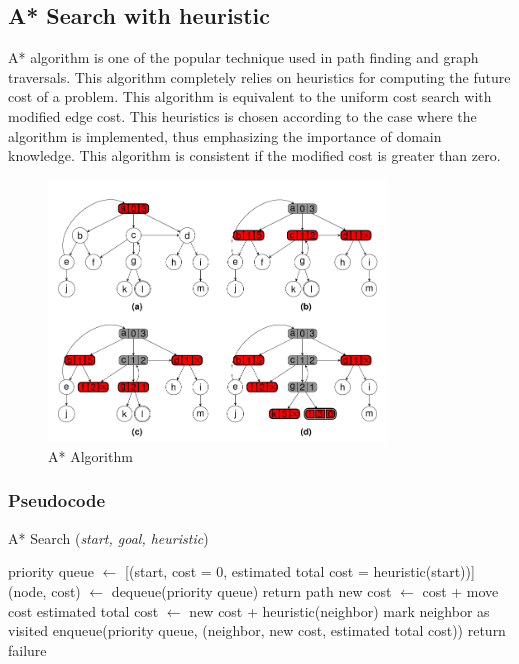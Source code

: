 \subsection{A* Search with heuristic}
\noindent A* algorithm is one of the popular technique used in path finding and graph traversals. This algorithm completely relies on heuristics for computing the future cost of a problem. This algorithm is equivalent to the uniform cost search with modified edge cost. This heuristics is chosen according to the case where the algorithm is implemented, thus emphasizing the importance of domain knowledge. This algorithm is consistent if the modified cost is greater than zero.

\begin{figure}[H]
	\centering
	\includegraphics[width=0.8\textwidth]{./imgs/astar.png}
	\caption{A* Algorithm}
\end{figure}

\subsubsection{Pseudocode}
\begin{algorithm}[H]
	\caption{A* Search (\textit{start, goal, heuristic})}
	\label{alg:astar}
	\begin{algorithmic}[1]
		\State priority queue \(\gets\) [(start, cost = 0, estimated total cost = heuristic(start))]
		\State (node, cost) \(\gets\) dequeue(priority queue)
		\State return path
		\EndIf
		\State new cost \(\gets\) cost + move cost
		\State estimated total cost \(\gets\) new cost + heuristic(neighbor)
		\State mark neighbor as visited
		\State enqueue(priority queue, (neighbor, new cost, estimated total cost))
		\EndIf
		\EndFor
		\EndWhile
		\State return failure
	\end{algorithmic}
\end{algorithm}

